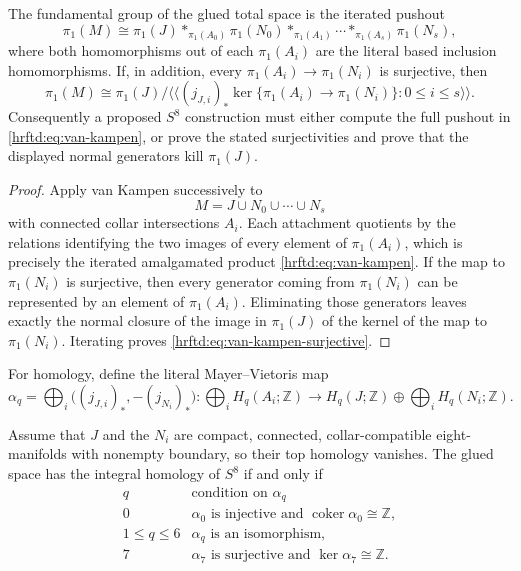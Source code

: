 \begin{proposition}
\label{hrftd:prop:van-kampen}
The fundamental group of the glued total space is the iterated pushout
\begin{equation}
 \pi_1(M)
 \cong
 \pi_1(J)
 *_{\pi_1(A_0)}\pi_1(N_0)
 *_{\pi_1(A_1)}\cdots
 *_{\pi_1(A_s)}\pi_1(N_s),
 \label{hrftd:eq:van-kampen}
\end{equation}
where both homomorphisms out of each \(\pi_1(A_i)\) are the literal based
inclusion homomorphisms.  If, in addition, every
\(\pi_1(A_i)\to\pi_1(N_i)\) is surjective, then
\begin{equation}
 \pi_1(M)
 \cong
 \pi_1(J)\Big/
 \Big\langle\!\Big\langle
 (j_{J,i})_*\ker\{\pi_1(A_i)\to\pi_1(N_i)\}:0\le i\le s
 \Big\rangle\!\Big\rangle .
 \label{hrftd:eq:van-kampen-surjective}
\end{equation}
Consequently a proposed \(S^8\) construction must either compute the full
pushout in \eqref{hrftd:eq:van-kampen}, or prove the stated surjectivities
and prove that the displayed normal generators kill \(\pi_1(J)\).
\end{proposition}

\begin{proof}
Apply van Kampen successively to
\[
 M=J\cup N_0\cup\cdots\cup N_s
\]
with connected collar intersections \(A_i\).  Each attachment quotients by
the relations identifying the two images of every element of
\(\pi_1(A_i)\), which is precisely the iterated amalgamated product
\eqref{hrftd:eq:van-kampen}.  If the map to \(\pi_1(N_i)\) is surjective,
then every generator coming from \(\pi_1(N_i)\) can be represented by an
element of \(\pi_1(A_i)\).  Eliminating those generators leaves exactly the
normal closure of the image in \(\pi_1(J)\) of the kernel of the map to
\(\pi_1(N_i)\).  Iterating proves
\eqref{hrftd:eq:van-kampen-surjective}.
\end{proof}

For homology, define the literal Mayer--Vietoris map
\begin{equation}
 \alpha_q
 =
 \bigoplus_i\bigl((j_{J,i})_*,-(j_{N_i})_*\bigr):
 \bigoplus_iH_q(A_i;\mathbb Z)
 \longrightarrow
 H_q(J;\mathbb Z)\oplus\bigoplus_iH_q(N_i;\mathbb Z).
 \label{hrftd:eq:mv-map}
\end{equation}

\begin{theorem}
\label{hrftd:thm:mv-criterion}
Assume that \(J\) and the \(N_i\) are compact, connected,
collar-compatible eight-manifolds with nonempty boundary, so their top
homology vanishes.  The glued space has the integral homology of \(S^8\) if
and only if
\[
\begin{array}{c|c}
q&\text{condition on }\alpha_q\\ \hline
0&\alpha_0\text{ is injective and }
   \operatorname{coker}\alpha_0\cong\mathbb Z,\\
1\le q\le6&\alpha_q\text{ is an isomorphism},\\
7&\alpha_7\text{ is surjective and }
   \ker\alpha_7\cong\mathbb Z.
\end{array}
\]
\end{theorem}

